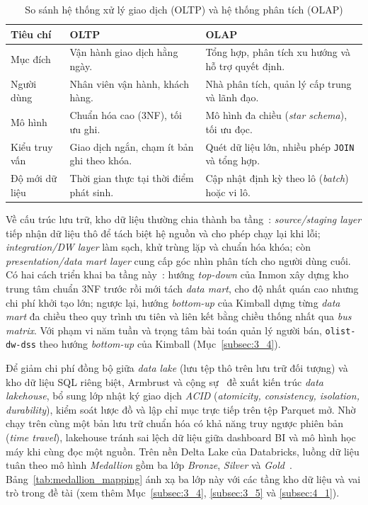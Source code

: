 \documentclass[a4paper]{article}
\begin{document}
\begin{table}[htbp]
\centering
\caption{So sánh hệ thống xử lý giao dịch (OLTP) và hệ thống phân tích (OLAP)}
\label{tab:oltp_vs_olap}
\begin{tabularx}{\textwidth}{l>{\raggedright\arraybackslash}X>{\raggedright\arraybackslash}X}
\toprule
\textbf{Tiêu chí} & \textbf{OLTP} & \textbf{OLAP} \\
\midrule
Mục đích & Vận hành giao dịch hằng ngày. & Tổng hợp, phân tích xu hướng và hỗ trợ quyết định. \\
Người dùng & Nhân viên vận hành, khách hàng. & Nhà phân tích, quản lý cấp trung và lãnh đạo. \\
Mô hình & Chuẩn hóa cao (3NF), tối ưu ghi. & Mô hình đa chiều (\textit{star schema}), tối ưu đọc. \\
Kiểu truy vấn & Giao dịch ngắn, chạm ít bản ghi theo khóa. & Quét dữ liệu lớn, nhiều phép \texttt{JOIN} và tổng hợp. \\
Độ mới dữ liệu & Thời gian thực tại thời điểm phát sinh. & Cập nhật định kỳ theo lô (\textit{batch}) hoặc vi lô. \\
\bottomrule
\end{tabularx}
\end{table}

Về cấu trúc lưu trữ, kho dữ liệu thường chia thành ba tầng~\cite{bib:inmon2005}: \textit{source/staging layer} tiếp nhận dữ liệu thô để tách biệt hệ nguồn và cho phép chạy lại khi lỗi; \textit{integration/DW layer} làm sạch, khử trùng lặp và chuẩn hóa khóa; còn \textit{presentation/data mart layer} cung cấp góc nhìn phân tích cho người dùng cuối. Có hai cách triển khai ba tầng này~\cite{bib:inmon2005,bib:kimball2013}: hướng \textit{top-down} của Inmon xây dựng kho trung tâm chuẩn 3NF trước rồi mới tách \textit{data mart}, cho độ nhất quán cao nhưng chi phí khởi tạo lớn; ngược lại, hướng \textit{bottom-up} của Kimball dựng từng \textit{data mart} đa chiều theo quy trình ưu tiên và liên kết bằng chiều thống nhất qua \textit{bus matrix}. Với phạm vi năm tuần và trọng tâm bài toán quản lý người bán, \texttt{olist-dw-dss} theo hướng \textit{bottom-up} của Kimball (Mục~\ref{subsec:3_4}).

Để giảm chi phí đồng bộ giữa \textit{data lake} (lưu tệp thô trên lưu trữ đối tượng) và kho dữ liệu SQL riêng biệt, Armbrust và cộng sự~\cite{bib:armbrust2021} đề xuất kiến trúc \textit{data lakehouse}, bổ sung lớp nhật ký giao dịch \textit{ACID} (\textit{atomicity, consistency, isolation, durability}), kiểm soát lược đồ và lập chỉ mục trực tiếp trên tệp Parquet mở. Nhờ chạy trên cùng một bản lưu trữ chuẩn hóa có khả năng truy ngược phiên bản (\textit{time travel}), lakehouse tránh sai lệch dữ liệu giữa dashboard BI và mô hình học máy khi cùng đọc một nguồn. Trên nền Delta Lake của Databricks, luồng dữ liệu tuân theo mô hình \textit{Medallion} gồm ba lớp \textit{Bronze}, \textit{Silver} và \textit{Gold}~\cite{bib:databricks}. Bảng~\ref{tab:medallion_mapping} ánh xạ ba lớp này với các tầng kho dữ liệu và vai trò trong đề tài (xem thêm Mục~\ref{subsec:3_4}, \ref{subsec:3_5} và \ref{subsec:4_1}).
\end{document}

